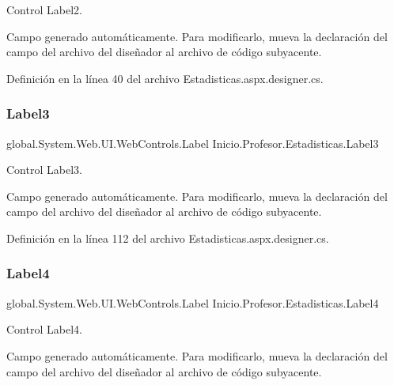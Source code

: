 Control Label2. 

Campo generado automáticamente. Para modificarlo, mueva la declaración del campo del archivo del diseñador al archivo de código subyacente. 

Definición en la línea 40 del archivo Estadisticas.\+aspx.\+designer.\+cs.

\mbox{\label{classInicio_1_1Profesor_1_1Estadisticas_aabd2c832778130594f125966239333a5}} 
\subsubsection{\texorpdfstring{Label3}{Label3}}
{\footnotesize\ttfamily global.\+System.\+Web.\+U\+I.\+Web\+Controls.\+Label Inicio.\+Profesor.\+Estadisticas.\+Label3\hspace{0.3cm}{\ttfamily [protected]}}



Control Label3. 

Campo generado automáticamente. Para modificarlo, mueva la declaración del campo del archivo del diseñador al archivo de código subyacente. 

Definición en la línea 112 del archivo Estadisticas.\+aspx.\+designer.\+cs.

\mbox{\label{classInicio_1_1Profesor_1_1Estadisticas_a70fd1d44295a1cd9446794a748af99e3}} 
\subsubsection{\texorpdfstring{Label4}{Label4}}
{\footnotesize\ttfamily global.\+System.\+Web.\+U\+I.\+Web\+Controls.\+Label Inicio.\+Profesor.\+Estadisticas.\+Label4\hspace{0.3cm}{\ttfamily [protected]}}



Control Label4. 

Campo generado automáticamente. Para modificarlo, mueva la declaración del campo del archivo del diseñador al archivo de código subyacente. 

